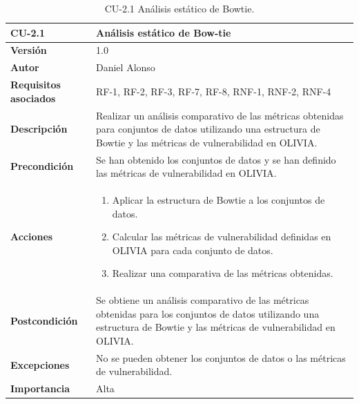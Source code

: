 \begin{table}[p]
	\centering
	\begin{tabularx}{\linewidth}{ p{} p{} }
		\toprule
		\textbf{CU-2.1}               & \textbf{Análisis estático de Bow-tie}                                         \\
		\toprule
		\textbf{Versión}              & 1.0                                                                           \\
		\textbf{Autor}                & Daniel Alonso                                                                 \\
		\textbf{Requisitos asociados} & RF-1, RF-2, RF-3, RF-7, RF-8, RNF-1, RNF-2, RNF-4                             \\
		\textbf{Descripción}          & Realizar un análisis comparativo de las métricas
		obtenidas para conjuntos de datos utilizando una estructura de Bowtie y las métricas
		de vulnerabilidad en OLIVIA.                                                                                  \\
		\textbf{Precondición}         & Se han obtenido los conjuntos de datos y se han definido
		las métricas de vulnerabilidad en OLIVIA.                                                                     \\
		\textbf{Acciones}             &
		\begin{enumerate}
			\def\labelenumi{\arabic{enumi}.}
			\tightlist
			\item Aplicar la estructura de Bowtie a los conjuntos de datos.
			\item Calcular las métricas de vulnerabilidad definidas en OLIVIA para cada conjunto de datos.
			\item Realizar una comparativa de las métricas obtenidas.
		\end{enumerate}                 \\
		\textbf{Postcondición}        & Se obtiene un análisis comparativo de las métricas obtenidas
		para los conjuntos de datos utilizando una estructura de Bowtie y las métricas de
		vulnerabilidad en OLIVIA.                                                                                     \\
		\textbf{Excepciones}          & No se pueden obtener los conjuntos de datos o las métricas de vulnerabilidad. \\
		\textbf{Importancia}          & Alta                                                                          \\
		\bottomrule
	\end{tabularx}
	\caption{CU-2.1 Análisis estático de Bowtie.}
	\label{tab:cu2.1}
\end{table}

